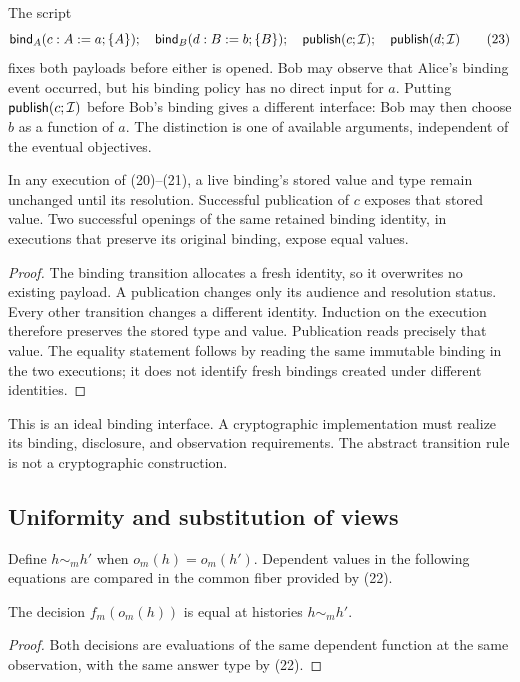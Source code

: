 \begin{example}
The script
\[
 \mathsf{bind}_A(c:A:=a;\{A\});\quad
 \mathsf{bind}_B(d:B:=b;\{B\});\quad
 \mathsf{publish}(c;\mathcal I);\quad\mathsf{publish}(d;\mathcal I)
 \tag{23}
\]
fixes both payloads before either is opened. Bob may observe that Alice's
binding event occurred, but his binding policy has no direct input for $a$.
Putting $\mathsf{publish}(c;\mathcal I)$ before Bob's binding gives a different interface:
Bob may then choose $b$ as a function of $a$. The distinction is one of
available arguments, independent of the eventual objectives.
\end{example}

\begin{proposition}
\label{prop:binding}
In any execution of (20)--(21), a live binding's stored value and type remain
unchanged until its resolution. Successful publication of $c$ exposes that
stored value. Two successful openings of the same retained binding identity,
in executions that preserve its original binding, expose equal values.
\end{proposition}
\begin{proof}
The binding transition allocates a fresh identity, so it overwrites no existing
payload. A publication changes only its audience and resolution status. Every
other transition changes a different identity. Induction on the execution
therefore preserves the stored type and value. Publication reads precisely
that value. The equality statement follows by reading the same immutable
binding in the two executions; it does not identify fresh bindings created
under different identities.
\end{proof}

This is an ideal binding interface. A cryptographic implementation must realize
its binding, disclosure, and observation requirements. The abstract transition
rule is not a cryptographic construction.

\subsection{Uniformity and substitution of views}

Define $h\sim_m h'$ when $o_m(h)=o_m(h')$. Dependent values in the following
equations are compared in the common fiber provided by (22).

\begin{proposition}
\label{prop:uniformity}
The decision $f_m(o_m(h))$ is equal at histories $h\sim_m h'$.
\end{proposition}
\begin{proof}
Both decisions are evaluations of the same dependent function at the same
observation, with the same answer type by (22).
\end{proof}

